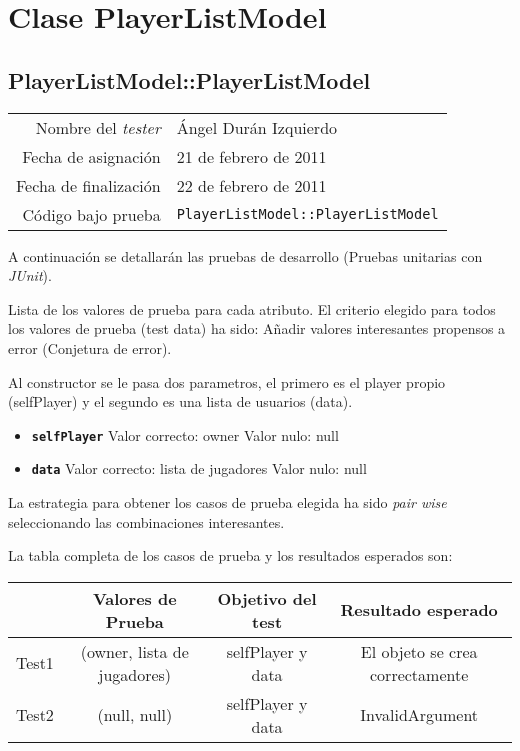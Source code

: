 \section{Clase PlayerListModel}

\subsection{PlayerListModel::PlayerListModel}

{\small
\begin{tabular}{r|l}
Nombre del \textit{tester} & \'Angel Dur\'an Izquierdo\\
Fecha de asignación & 21 de febrero de 2011 \\
Fecha de finalización & 22 de febrero de 2011 \\
Código bajo prueba & \texttt{PlayerListModel::PlayerListModel}
\end{tabular}
}

A continuación se detallarán las pruebas de desarrollo (Pruebas unitarias con \textit{JUnit}).

Lista de los valores de prueba para cada atributo.
El criterio elegido para todos los valores de prueba (test data) ha sido: Añadir valores interesantes propensos a error (Conjetura de error).

Al constructor se le pasa dos parametros, el primero es el player propio (selfPlayer) y el segundo es una lista de usuarios (data).

\begin{itemize}
\item \textbf{\texttt{selfPlayer}}
\subitem Valor correcto: owner
\subitem Valor nulo: null 
\end{itemize}

\begin{itemize}
\item \textbf{\texttt{data}}
\subitem Valor correcto: lista de jugadores
\subitem Valor nulo: null 
\end{itemize}

La estrategia para obtener los casos de prueba elegida ha sido
\textit{pair wise} seleccionando las combinaciones interesantes.

La tabla completa de los casos de prueba y los resultados esperados son:

{\footnotesize
\begin{longtable}[c]{lccc}
 & \textbf{Valores de Prueba} & \textbf{Objetivo del test} & \textbf{Resultado esperado} \\
\hline \hline
\endhead

Test1 & (owner, lista de jugadores) & selfPlayer y data & El objeto se crea correctamente\\
Test2 & (null, null) & selfPlayer y data & InvalidArgument\\

\hline
\end{longtable}
}

